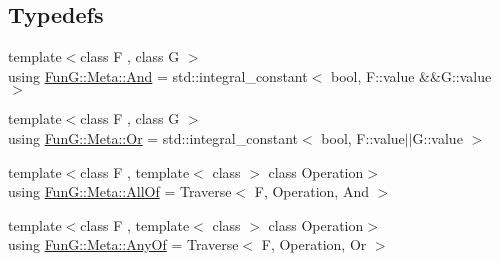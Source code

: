 \subsection*{Typedefs}
\begin{DoxyCompactItemize}
\item 
{\footnotesize template$<$class F , class G $>$ }\\using \hyperlink{namespaceFunG_1_1Meta_a6f0fce21e31ab8fdc307eddead3b8d66}{Fun\+G\+::\+Meta\+::\+And} = std\+::integral\+\_\+constant$<$ bool, F\+::value \&\&G\+::value $>$
\item 
{\footnotesize template$<$class F , class G $>$ }\\using \hyperlink{namespaceFunG_1_1Meta_a54cebc5541fa7677e239a9b7a84aba7e}{Fun\+G\+::\+Meta\+::\+Or} = std\+::integral\+\_\+constant$<$ bool, F\+::value$\vert$$\vert$G\+::value $>$
\item 
{\footnotesize template$<$class F , template$<$ class $>$ class Operation$>$ }\\using \hyperlink{namespaceFunG_1_1Meta_aa62ce805a20b342ffc1947c210be3501}{Fun\+G\+::\+Meta\+::\+All\+Of} = Traverse$<$ F, Operation, And $>$
\item 
{\footnotesize template$<$class F , template$<$ class $>$ class Operation$>$ }\\using \hyperlink{namespaceFunG_1_1Meta_a54a94493bb1caa42606dd7e6744abf8c}{Fun\+G\+::\+Meta\+::\+Any\+Of} = Traverse$<$ F, Operation, Or $>$
\end{DoxyCompactItemize}
